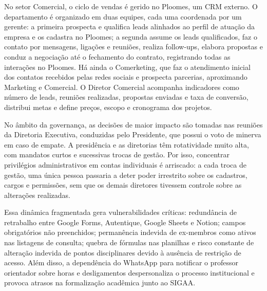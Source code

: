 No setor Comercial, o ciclo de vendas é gerido no Ploomes, um CRM externo. O departamento é organizado em duas equipes, cada uma coordenada por um gerente: a primeira prospecta e qualifica leads alinhados ao perfil de atuação da empresa e os cadastra no Ploomes; a segunda assume os leads qualificados, faz o contato por mensagens, ligações e reuniões, realiza follow-ups, elabora propostas e conduz a negociação até o fechamento do contrato, registrando todas as interações no Ploomes. Há ainda o Comerketing, que faz o atendimento inicial dos contatos recebidos pelas redes sociais e prospecta parcerias, aproximando Marketing e Comercial. O Diretor Comercial acompanha indicadores como número de leads, reuniões realizadas, propostas enviadas e taxa de conversão, distribui metas e define preços, escopo e cronograma dos projetos.

No âmbito da governança, as decisões de maior impacto são tomadas nas reuniões da Diretoria Executiva, conduzidas pelo Presidente, que possui o voto de minerva em caso de empate. A presidência e as diretorias têm rotatividade muito alta, com mandatos curtos e sucessivas trocas de gestão. Por isso, concentrar privilégios administrativos em contas individuais é arriscado: a cada troca de gestão, uma única pessoa passaria a deter poder irrestrito sobre os cadastros, cargos e permissões, sem que os demais diretores tivessem controle sobre as alterações realizadas.

Essa dinâmica fragmentada gera vulnerabilidades críticas: redundância de retrabalho entre Google Forms, Autentique, Google Sheets e Notion; campos obrigatórios não preenchidos; permanência indevida de ex-membros como ativos nas listagens de consulta; quebra de fórmulas nas planilhas e risco constante de alteração indevida de pontos disciplinares devido à ausência de restrição de acesso. Além disso, a dependência do WhatsApp para notificar o professor orientador sobre horas e desligamentos despersonaliza o processo institucional e provoca atrasos na formalização acadêmica junto ao SIGAA.

